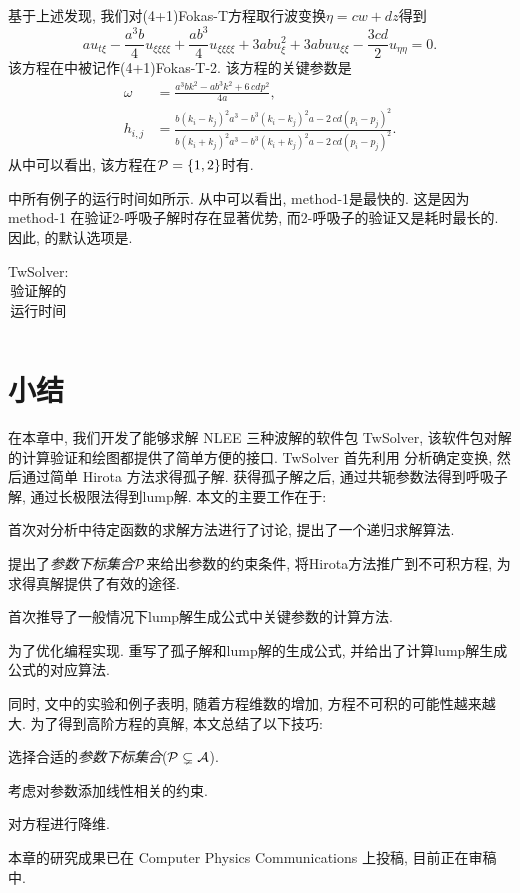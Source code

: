 基于上述发现, 我们对(4+1)Fokas-T方程取行波变换$\eta=cw+dz$得到
\begin{equation}
    au_{t\xi}-\frac{a^3b}{4}u_{\xi\xi\xi\xi}+\frac{ab^3}{4}u_{\xi\xi\xi\xi}+3abu_{\xi}^2+3abuu_{\xi\xi}-\frac{3cd}{2}u_{\eta\eta}=0.  \label{Fokas-T-2}
\end{equation}
该方程在中被记作(4+1)Fokas-T-2. 该方程的关键参数是
\begin{equation}
\begin{split}
    \omega&={\frac {{a}^{3}b{k}^{2}-a{b}^{3}{k}^{2}+6\,cd{p}^{2}}{4a}}, \\ 
    h_{{i,j}}&={\frac {b \left( k_{{i}}-k_{{j}} \right) ^{2}{a}^{3}-{b}^{3}
    \left( k_{{i}}-k_{{j}} \right) ^{2}a-2\,cd \left( p_{{i}}-p_{{j}}
    \right) ^{2}}{b \left( k_{{i}}+k_{{j}} \right) ^{2}{a}^{3}-{b}^{3}
    \left( k_{{i}}+k_{{j}} \right) ^{2}a-2\,cd \left( p_{{i}}-p_{{j}}
    \right) ^{2}}}.
\end{split}
\end{equation}
从中可以看出, 该方程在$\mathcal{P}=\{1,2\}$时有\TrueSol{}.

中所有例子的运行时间如所示. 从中可以看出, method-1是最快的. 这是因为 method-1 在验证2-呼吸子解时存在显著优势, 而2-呼吸子的验证又是耗时最长的. 因此, 的默认选项是. 

\begin{table}[htbp]
\centering 
\caption{TwSolver: 验证解的运行时间} \label{runtime}
\begin{tabular}{c|ccc|c}
\hline

\hline
\end{tabular}
\end{table}

\section{小结}
在本章中, 我们开发了能够求解 NLEE 三种波解的软件包 TwSolver, 该软件包对解的计算\D 验证和绘图都提供了简单方便的接口. TwSolver 首先利用 \Painleve{} 分析确定变换, 然后通过简单 Hirota 方法求得孤子解. 获得孤子解之后, 通过共轭参数法得到呼吸子解, 通过长极限法得到lump解.  本文的主要工作在于: 
\begin{compactenum}[(1)]
\item 首次对\Painleve{}分析中待定函数的求解方法进行了讨论, 提出了一个递归求解算法. 
\item 提出了\emph{参数下标集合}$\mathcal{P}$来给出参数的约束条件, 将Hirota方法推广到不可积方程, 为求得真解提供了有效的途径. 
\item 首次推导了一般情况下lump解生成公式中关键参数的计算方法.
\item 为了优化编程实现. 重写了孤子解和lump解的生成公式, 并给出了计算lump解生成公式的对应算法.
\end{compactenum}

同时, 文中的实验和例子表明, 随着方程维数的增加, 方程不可积的可能性越来越大. 为了得到高阶方程的真解, 本文总结了以下技巧:
\begin{compactenum}[(1)]
\item 选择合适的\emph{参数下标集合}($\mathcal{P}\subsetneq  \mathcal{A}$). 
\item 考虑对参数添加线性相关的约束.
\item 对方程进行降维.
\end{compactenum}

本章的研究成果已在 Computer Physics Communications 上投稿, 目前正在审稿中. 
